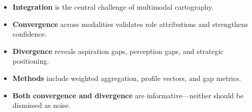 \documentclass[../main.tex]{subfiles}
\begin{document}
\begin{summarybox}
\begin{itemize}[leftmargin=*, itemsep=0.3em]
\item \textbf{Integration} is the central challenge of multimodal cartography.

\item \textbf{Convergence} across modalities validates role attributions and strengthens confidence.

\item \textbf{Divergence} reveals aspiration gaps, perception gaps, and strategic positioning.

\item \textbf{Methods} include weighted aggregation, profile vectors, and gap metrics.

\item \textbf{Both convergence and divergence} are informative---neither should be dismissed as noise.
\end{itemize}
\end{summarybox}

\vspace{0.5cm}

\begin{center}
\end{center}

\closeintermezzo
\end{document}
